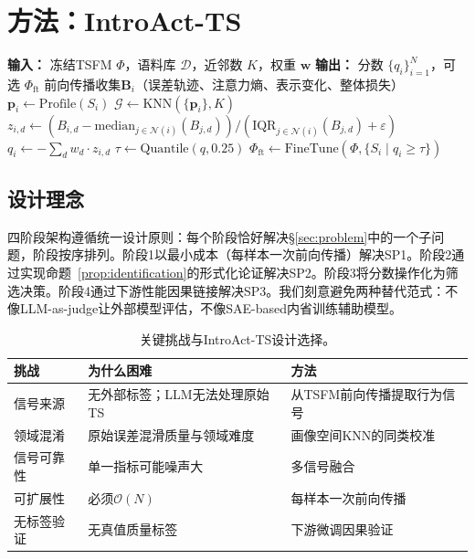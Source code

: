 \documentclass{article}
\begin{document}
\section{方法：IntroAct-TS}

\begin{algorithm}[t]
\caption{IntroAct-TS}
\label{alg:introspect}
\begin{algorithmic}[1]
\State \textbf{输入：} 冻结TSFM $\Phi$，语料库 $\mathcal{D}$，近邻数 $K$，权重 $\mathbf{w}$
\State \textbf{输出：} 分数 $\{q_i\}_{i=1}^{N}$，可选 $\Phi_{\text{ft}}$
 
    \State 前向传播收集$\mathbf{B}_i$（误差轨迹、注意力熵、表示变化、整体损失）
    \State $\mathbf{p}_i \gets \text{Profile}(S_i)$ 
\EndFor
\State $\mathcal{G} \gets \text{KNN}(\{\mathbf{p}_i\}, K)$ 
    \State $z_{i,d} \gets (B_{i,d} - \text{median}_{j\in\mathcal{N}(i)}(B_{j,d})) / (\text{IQR}_{j\in\mathcal{N}(i)}(B_{j,d}) + \varepsilon)$
    \State $q_i \gets -\sum_d w_d \cdot z_{i,d}$
\EndFor
\State $\tau \gets \text{Quantile}(q, 0.25)$ 
\State $\Phi_{\text{ft}} \gets \text{FineTune}(\Phi, \{S_i \mid q_i \geq \tau\})$
\end{algorithmic}
\end{algorithm}

\subsection{设计理念}

四阶段架构遵循统一设计原则：每个阶段恰好解决\S\ref{sec:problem}中的一个子问题，阶段按序排列。阶段1以最小成本（每样本一次前向传播）解决SP1。阶段2通过实现命题~\ref{prop:identification}的形式化论证解决SP2。阶段3将分数操作化为筛选决策。阶段4通过下游性能因果链接解决SP3。我们刻意避免两种替代范式：不像LLM-as-judge让外部模型评估，不像SAE-based内省训练辅助模型。

\begin{table}[t]
\centering
\caption{关键挑战与IntroAct-TS设计选择。}
\label{tab:challenge_module}
\begin{tabular}{p{3.5cm}p{5.5cm}p{5.2cm}}
\toprule
\textbf{挑战} & \textbf{为什么困难} & \textbf{方法} \\
\midrule
信号来源 & 无外部标签；LLM无法处理原始TS & 从TSFM前向传播提取行为信号 \\
领域混淆 & 原始误差混滑质量与领域难度 & 画像空间KNN的同类校准 \\
信号可靠性 & 单一指标可能噪声大 & 多信号融合 \\
可扩展性 & 必须$\mathcal{O}(N)$ & 每样本一次前向传播 \\
无标签验证 & 无真值质量标签 & 下游微调因果验证 \\
\bottomrule
\end{tabular}
\end{table}
\end{document}
